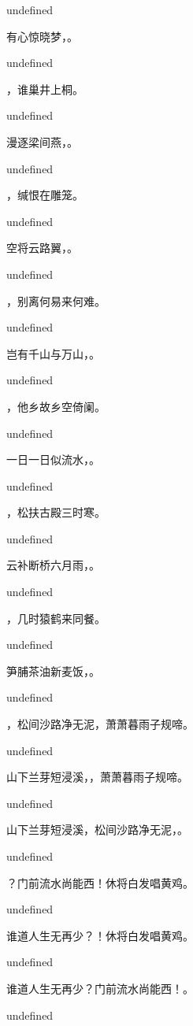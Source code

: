 \documentclass[12pt, a4paper, addpoints]{exam}
\begin{document}
\begin{questions}
undefined

\question[3] 有心惊晓梦，\fillin。

undefined

\question[3] \fillin，谁巢井上桐。

undefined

\question[3] 漫逐梁间燕，\fillin。

undefined

\question[3] \fillin，缄恨在雕笼。

undefined

\question[3] 空将云路翼，\fillin。

undefined

\question[3] \fillin，别离何易来何难。

undefined

\question[3] 岂有千山与万山，\fillin。

undefined

\question[3] \fillin，他乡故乡空倚阑。

undefined

\question[3] 一日一日似流水，\fillin。

undefined

\question[3] \fillin，松扶古殿三时寒。

undefined

\question[3] 云补断桥六月雨，\fillin。

undefined

\question[3] \fillin，几时猿鹤来同餐。

undefined

\question[3] 笋脯茶油新麦饭，\fillin。

undefined

\question[3] \fillin，松间沙路净无泥，萧萧暮雨子规啼。

undefined

\question[3] 山下兰芽短浸溪，\fillin，萧萧暮雨子规啼。

undefined

\question[3] 山下兰芽短浸溪，松间沙路净无泥，\fillin。

undefined

\question[3] \fillin？门前流水尚能西！休将白发唱黄鸡。

undefined

\question[3] 谁道人生无再少？\fillin！休将白发唱黄鸡。

undefined

\question[3] 谁道人生无再少？门前流水尚能西！\fillin。

undefined


\end{questions}
\end{document}
